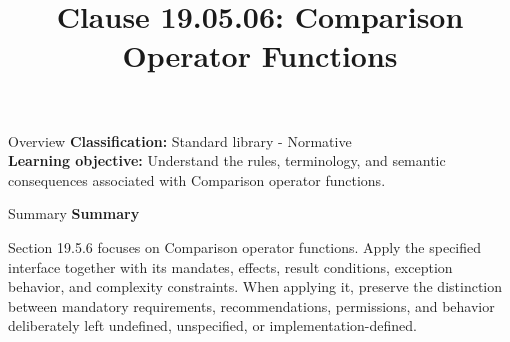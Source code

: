 \documentclass[10pt,letterpaper]{article}
\title{Clause 19.05.06: Comparison Operator Functions}
\author{}
\date{}
\begin{document}
\maketitle
\begin{CornellOverviewBox}{Overview}
\textbf{Classification:} Standard library - Normative\\[2pt]
\textbf{Learning objective:} Understand the rules, terminology, and semantic consequences associated with Comparison operator functions.
\end{CornellOverviewBox}\begin{CornellSummaryBox}{Summary}
{\sffamily\bfseries\color{Accent} Summary}\par\vspace{3pt}Section 19.5.6 focuses on Comparison operator functions. Apply the specified interface together with its mandates, effects, result conditions, exception behavior, and complexity constraints. When applying it, preserve the distinction between mandatory requirements, recommendations, permissions, and behavior deliberately left undefined, unspecified, or implementation-defined.
\end{CornellSummaryBox}
\end{document}
